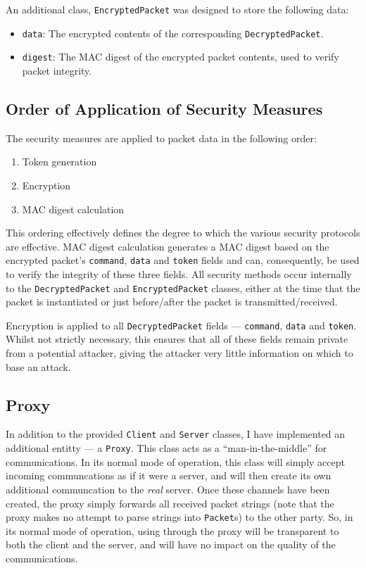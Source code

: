 \documentclass[a4paper,11pt]{article}
\begin{document}
An additional class, \verb+EncryptedPacket+ was designed to store the following
data:
\begin{itemize}
\item \verb+data+: The encrypted contents of the corresponding 
\verb+DecryptedPacket+.
\item \verb+digest+: The MAC digest of the encrypted packet contents, used to 
verify packet integrity.
\end{itemize}

\subsection{Order of Application of Security Measures}
The security measures are applied to packet data in the following order:
\begin{enumerate}
\item Token generation
\item Encryption
\item MAC digest calculation
\end{enumerate}

This ordering effectively defines the degree to which the various security 
protocols are effective. MAC digest calculation generates a MAC digest based on
the encrypted packet's \verb+command+, \verb+data+ and \verb+token+ fields and 
can, consequently, be used to verify the integrity of these three fields. All 
security methods occur internally to the \verb+DecryptedPacket+ and 
\verb+EncryptedPacket+ classes, either at the time that the packet is 
instantiated or just before/after the packet is transmitted/received.

Encryption is applied to all \verb+DecryptedPacket+ fields --- \verb+command+, 
\verb+data+ and \verb+token+. Whilst not strictly necessary, this ensures that 
all of these fields remain private from a potential attacker, giving the 
attacker very little information on which to base an attack. 

\subsection{Proxy}
In addition to the provided \serviceName{} \verb+Client+ and \verb+Server+ 
classes, I have implemented an additional \serviceName{} entitty --- a 
\serviceName{} \verb+Proxy+. This class acts as a ``man-in-the-middle'' for
\serviceName{} communications. In its normal mode of operation, this class will
simply accept incoming \serviceName{} communcations as if it were a 
\serviceName{} server, and will then create its own additional \serviceName{}
communcation to the \emph{real} \serviceName{} server. Once these channels have
been created, the proxy simply forwards all received packet strings (note that 
the proxy makes no attempt to parse strings into \verb+Packet+s) to the other
party. So, in its normal mode of operation, using \serviceName{} through the
proxy will be transparent to both the client and the server, and will have no
impact on the quality of the communications.
\end{document}
